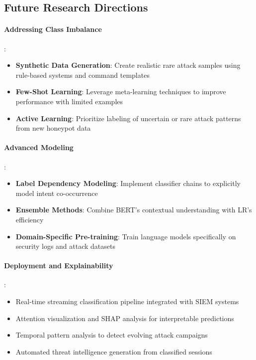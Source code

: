 \documentclass[acmlarge,screen,nonacm]{acmart}
\begin{document}
\subsection{Future Research Directions}

\paragraph{Addressing Class Imbalance}:
\begin{itemize}
    \item \textbf{Synthetic Data Generation}: Create realistic rare attack samples using rule-based systems and command templates
    \item \textbf{Few-Shot Learning}: Leverage meta-learning techniques to improve performance with limited examples
    \item \textbf{Active Learning}: Prioritize labeling of uncertain or rare attack patterns from new honeypot data
\end{itemize}

\paragraph{Advanced Modeling}:
\begin{itemize}
    \item \textbf{Label Dependency Modeling}: Implement classifier chains to explicitly model intent co-occurrence
    \item \textbf{Ensemble Methods}: Combine BERT's contextual understanding with LR's efficiency
    \item \textbf{Domain-Specific Pre-training}: Train language models specifically on security logs and attack datasets
\end{itemize}

\paragraph{Deployment and Explainability}:
\begin{itemize}
    \item Real-time streaming classification pipeline integrated with SIEM systems
    \item Attention visualization and SHAP analysis for interpretable predictions
    \item Temporal pattern analysis to detect evolving attack campaigns
    \item Automated threat intelligence generation from classified sessions
\end{itemize}
\end{document}
